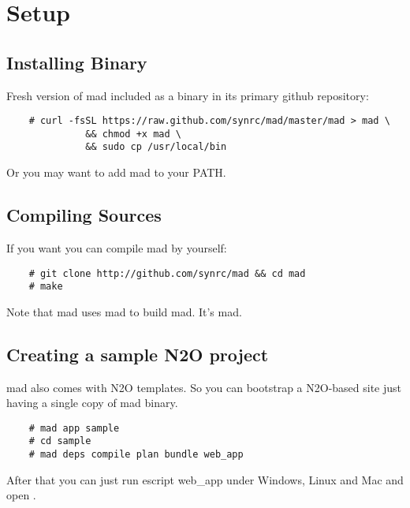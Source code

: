 \section{Setup}

\subsection{Installing Binary}

Fresh version of mad included as a binary in its primary github repository:

\vspace{1\baselineskip}
\begin{lstlisting}
    # curl -fsSL https://raw.github.com/synrc/mad/master/mad > mad \
              && chmod +x mad \
              && sudo cp /usr/local/bin
\end{lstlisting}
\vspace{1\baselineskip}

Or you may want to add mad to your PATH.

\subsection{Compiling Sources}

If you want you can compile mad by yourself:

\vspace{1\baselineskip}
\begin{lstlisting}
    # git clone http://github.com/synrc/mad && cd mad
    # make
\end{lstlisting}
\vspace{1\baselineskip}

Note that mad uses mad to build mad. It's mad.

\subsection{Creating a sample N2O project}

mad also comes with N2O templates. So you can bootstrap a N2O-based site
just having a single copy of mad binary.

\vspace{1\baselineskip}
\begin{lstlisting}
    # mad app sample
    # cd sample
    # mad deps compile plan bundle web_app
\end{lstlisting}
\vspace{1\baselineskip}

After that you can just run escript web_app under Windows, Linux and
Mac and open .

